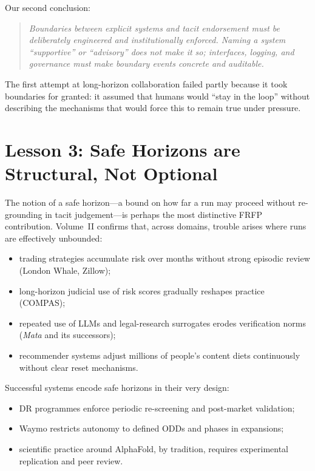 Our second conclusion:

\begin{quote}
  \emph{Boundaries between explicit systems and tacit endorsement must be deliberately engineered and institutionally enforced.
  Naming a system ``supportive'' or ``advisory'' does not make it so; interfaces, logging, and governance must make boundary events concrete and auditable.}
\end{quote}

The first attempt at long-horizon collaboration failed partly because it took boundaries for granted:
it assumed that humans would ``stay in the loop'' without describing the mechanisms that would force this to remain true under pressure.

\section*{Lesson 3: Safe Horizons are Structural, Not Optional}

The notion of a safe horizon---a bound on how far a run may proceed without re-grounding in tacit judgement---is perhaps the most distinctive FRFP contribution.
Volume~II confirms that, across domains, trouble arises where runs are effectively unbounded:

\begin{itemize}
  \item trading strategies accumulate risk over months without strong episodic review (London Whale, Zillow);
  \item long-horizon judicial use of risk scores gradually reshapes practice (COMPAS);
  \item repeated use of LLMs and legal-research surrogates erodes verification norms (\emph{Mata} and its successors);
  \item recommender systems adjust millions of people's content diets continuously without clear reset mechanisms.
\end{itemize}

Successful systems encode safe horizons in their very design:

\begin{itemize}
  \item DR programmes enforce periodic re-screening and post-market validation;
  \item Waymo restricts autonomy to defined ODDs and phases in expansions;
  \item scientific practice around AlphaFold, by tradition, requires experimental replication and peer review.
\end{itemize}


